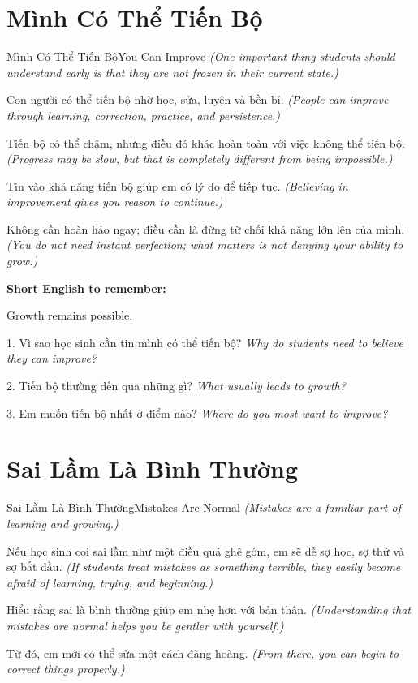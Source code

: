 \section{Mình Có Thể Tiến Bộ}
\begin{truyen}{Mình Có Thể Tiến Bộ}{You Can Improve}
\textit{(One important thing students should understand early is that they are not frozen in their current state.)}

Con người có thể tiến bộ nhờ học, sửa, luyện và bền bỉ.
\textit{(People can improve through learning, correction, practice, and persistence.)}

Tiến bộ có thể chậm, nhưng điều đó khác hoàn toàn với việc không thể tiến bộ.
\textit{(Progress may be slow, but that is completely different from being impossible.)}

Tin vào khả năng tiến bộ giúp em có lý do để tiếp tục.
\textit{(Believing in improvement gives you reason to continue.)}
\end{truyen}

\begin{baihoc}
Không cần hoàn hảo ngay; điều cần là đừng từ chối khả năng lớn lên của mình.
\textit{(You do not need instant perfection; what matters is not denying your ability to grow.)}
\end{baihoc}

\begin{ghinhoanh}
\textbf{Short English to remember:}

Growth remains possible.

\end{ghinhoanh}

\begin{tuhocnhanh}
1. Vì sao học sinh cần tin mình có thể tiến bộ? \textit{Why do students need to believe they can improve?}

2. Tiến bộ thường đến qua những gì? \textit{What usually leads to growth?}

3. Em muốn tiến bộ nhất ở điểm nào? \textit{Where do you most want to improve?}
\end{tuhocnhanh}
\ngancach

\section{Sai Lầm Là Bình Thường}
\begin{truyen}{Sai Lầm Là Bình Thường}{Mistakes Are Normal}
\textit{(Mistakes are a familiar part of learning and growing.)}

Nếu học sinh coi sai lầm như một điều quá ghê gớm, em sẽ dễ sợ học, sợ thử và sợ bắt đầu.
\textit{(If students treat mistakes as something terrible, they easily become afraid of learning, trying, and beginning.)}

Hiểu rằng sai là bình thường giúp em nhẹ hơn với bản thân.
\textit{(Understanding that mistakes are normal helps you be gentler with yourself.)}

Từ đó, em mới có thể sửa một cách đàng hoàng.
\textit{(From there, you can begin to correct things properly.)}
\end{truyen}

